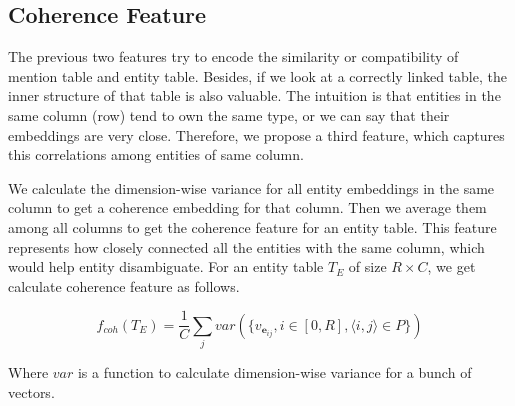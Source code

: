 \subsection{Coherence Feature}
\label{sec:coherence}

The previous two features try to encode the similarity or compatibility of mention table and entity table. Besides, if we look at a correctly linked table, the inner structure of that table is also valuable.
The intuition is that entities in the same column (row) tend to own the same type, or we can say that their embeddings are very close. Therefore, we propose a third feature, which captures this correlations among entities of same column. 

We calculate the dimension-wise variance for all entity embeddings in the same column to get a coherence embedding for that column. Then we average them among all columns to get the coherence feature for an entity table. This feature represents how closely connected all the entities with the same column, which would help entity disambiguate.
For an entity table $T_E$ of size $R\times C$, we get calculate coherence feature as follows.

\begin{equation}
\label{eqn:coherence}
f_{coh}(T_E) = \frac{1}{C} \sum_{j} var(\{v_{\textbf{e}_{ij}}, i\in[0, R], \langle i,j \rangle \in P\})
\end{equation}

Where $var$ is a function to calculate dimension-wise variance for a bunch of vectors.